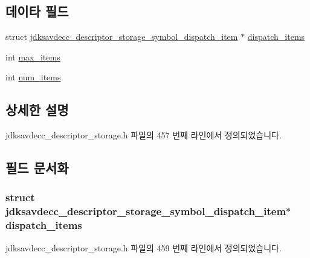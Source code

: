 \subsection*{데이타 필드}
\begin{DoxyCompactItemize}
\item 
struct \hyperlink{structjdksavdecc__descriptor__storage__symbol__dispatch__item}{jdksavdecc\+\_\+descriptor\+\_\+storage\+\_\+symbol\+\_\+dispatch\+\_\+item} $\ast$ \hyperlink{structjdksavdecc__descriptor__storage__symbols_a7065f86fddb5bb5941ca46301169786c}{dispatch\+\_\+items}
\item 
int \hyperlink{structjdksavdecc__descriptor__storage__symbols_a8cde3174940399d21be04f9df675cd2d}{max\+\_\+items}
\item 
int \hyperlink{structjdksavdecc__descriptor__storage__symbols_af0bbed14cf6294c187499179ee38189d}{num\+\_\+items}
\end{DoxyCompactItemize}


\subsection{상세한 설명}


jdksavdecc\+\_\+descriptor\+\_\+storage.\+h 파일의 457 번째 라인에서 정의되었습니다.



\subsection{필드 문서화}
\subsubsection[{\texorpdfstring{dispatch\+\_\+items}{dispatch_items}}]{\setlength{\rightskip}{0pt plus 5cm}struct {\bf jdksavdecc\+\_\+descriptor\+\_\+storage\+\_\+symbol\+\_\+dispatch\+\_\+item}$\ast$ dispatch\+\_\+items}\hypertarget{structjdksavdecc__descriptor__storage__symbols_a7065f86fddb5bb5941ca46301169786c}{}\label{structjdksavdecc__descriptor__storage__symbols_a7065f86fddb5bb5941ca46301169786c}


jdksavdecc\+\_\+descriptor\+\_\+storage.\+h 파일의 459 번째 라인에서 정의되었습니다.

